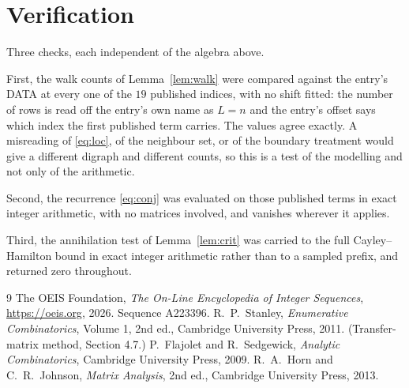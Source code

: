 \documentclass[11pt,a4paper]{article}
\theoremstyle{plain}
\theoremstyle{definition}
\begin{document}
\section{Verification}

Three checks, each independent of the algebra above.

First, the walk counts of Lemma~\ref{lem:walk} were compared against the entry's DATA at
every one of the $19$ published indices, with no shift fitted: the number of rows is
read off the entry's own name as $L=n$ and the entry's offset says which index the first
published term carries. The values agree exactly. A misreading of \eqref{eq:loc}, of the
neighbour set, or of the boundary treatment would give a different digraph and different
counts, so this is a test of the modelling and not only of the arithmetic.

Second, the recurrence \eqref{eq:conj} was evaluated on those published terms in exact
integer arithmetic, with no matrices involved, and vanishes wherever it applies.

Third, the annihilation test of Lemma~\ref{lem:crit} was carried to the full
Cayley--Hamilton bound in exact integer arithmetic rather than to a sampled prefix, and
returned zero throughout.

\begin{thebibliography}{9}
 The OEIS Foundation, \emph{The On-Line Encyclopedia of Integer
Sequences}, \url{https://oeis.org}, 2026. Sequence A223396.
 R.~P.~Stanley, \emph{Enumerative Combinatorics}, Volume 1, 2nd ed.,
Cambridge University Press, 2011. (Transfer-matrix method, Section 4.7.)
 P.~Flajolet and R.~Sedgewick, \emph{Analytic Combinatorics}, Cambridge
University Press, 2009.
 R.~A.~Horn and C.~R.~Johnson, \emph{Matrix Analysis}, 2nd ed., Cambridge
University Press, 2013.
\end{thebibliography}
\end{document}
